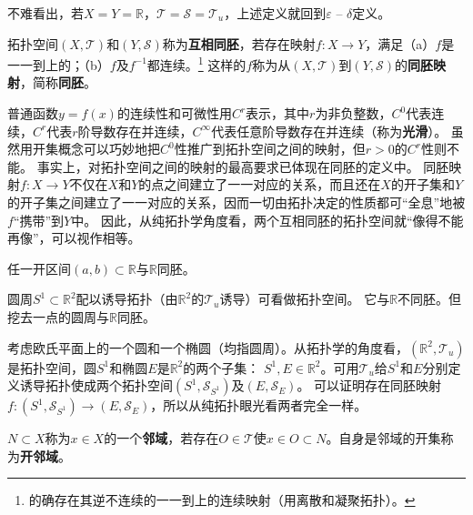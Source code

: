 \begin{note}
	不难看出，若$X = Y = \mathbb{R}$，$\mathscr{T} = \mathscr{S} = \mathscr{T}_u$，上述定义就回到$\varepsilon$ -- $\delta$定义。
\end{note}

\begin{definition}
	拓扑空间$(X, \mathscr{T})$和$(Y, \mathscr{S})$称为\textbf{互相同胚}，若存在映射$f \colon X \to Y$，满足（a）$f$是一一到上的；（b）$f$及$f^{-1}$都连续。\footnote{
		的确存在其逆不连续的一一到上的连续映射（用离散和凝聚拓扑）。
	}
	这样的$f$称为从$(X, \mathscr{T})$到$(Y, \mathscr{S})$的\textbf{同胚映射}，简称\textbf{同胚}。
\end{definition}

普通函数$y = f(x)$的连续性和可微性用$C^r$表示，其中$r$为非负整数，$C^0$代表连续，$C^r$代表$r$阶导数存在并连续，$C^\infty$代表任意阶导数存在并连续（称为\textbf{光滑}）。
虽然用开集概念可以巧妙地把$C^0$性推广到拓扑空间之间的映射，但$r > 0$的$C^r$性则不能。
事实上，对拓扑空间之间的映射的最高要求已体现在同胚的定义中。
同胚映射$f \colon X \to Y$不仅在$X$和$Y$的点之间建立了一一对应的关系，而且还在$X$的开子集和$Y$的开子集之间建立了一一对应的关系，因而一切由拓扑决定的性质都可``全息''地被$f$``携带''到$Y$中。
因此，从纯拓扑学角度看，两个互相同胚的拓扑空间就``像得不能再像''，可以视作相等。

\begin{example}
	任一开区间$(a, b) \subset \mathbb{R}$与$\mathbb{R}$同胚。
\end{example}

\begin{example}
	圆周$S^1 \subset \mathbb{R}^2$配以诱导拓扑（由$\mathbb{R}^2$的$\mathscr{T}_u$诱导）可看做拓扑空间。
	它与$\mathbb{R}$不同胚。但挖去一点的圆周与$\mathbb{R}$同胚。
\end{example}

\begin{example}
	考虑欧氏平面上的一个圆和一个椭圆（均指圆周）。从拓扑学的角度看，$(\mathbb{R}^2, \mathscr{T}_u)$是拓扑空间，圆$S^1$和椭圆$E$是$\mathbb{R}^2$的两个子集：
	$S^1, E \in \mathbb{R}^2$。可用$\mathscr{T}_u$给$S^1$和$E$分别定义诱导拓扑使成两个拓扑空间$(S^1, \mathscr{S}_{S^1})$及$(E, \mathscr{S}_E)$。
	可以证明存在同胚映射$f \colon (S^1, \mathscr{S}_{S^1}) \to (E, \mathscr{S}_E)$，所以从纯拓扑眼光看两者完全一样。
\end{example}

\begin{definition}
	$N \subset X$称为$x \in X$的一个\textbf{邻域}，若存在$O \in \mathscr{T}$使$x \in O \subset N$。自身是邻域的开集称为\textbf{开邻域}。
\end{definition}

